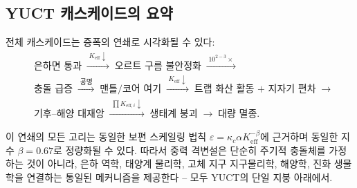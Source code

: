 \documentclass[12pt,a4paper]{article}
\begin{document}
	\subsection{YUCT 캐스케이드의 요약}
	전체 캐스케이드는 증폭의 연쇄로 시각화될 수 있다:
	{\small
		\[
		\begin{aligned}
			&\text{은하면 통과}
			\;\xrightarrow{\;K_{\mathrm{eff}}\downarrow\;}\;
			\text{오르트 구름 불안정화}
			\;\xrightarrow{\;10^{2-3}\times\;}\\
			&\text{충돌 급증}
			\;\xrightarrow{\;\text{공명}\;}\;
			\text{맨틀/코어 여기}
			\;\xrightarrow{\;K_{\mathrm{eff}}\downarrow\;}\;
			\text{트랩 화산 활동 + 지자기 편차}
			\;\xrightarrow{\;}\\
			&\text{기후–해양 대재앙}
			\;\xrightarrow{\;\prod K_{\mathrm{eff},i}\downarrow\;}\;
			\text{생태계 붕괴}
			\;\xrightarrow{\;}\;
			\text{대량 멸종}.
		\end{aligned}
		\]
	}
	
	이 연쇄의 모든 고리는 동일한 보편 스케일링 법칙 \(\varepsilon = \kappa_c \alpha K_{\mathrm{eff}}^{-\beta}\)에 근거하며 동일한 지수 \(\beta = 0.67\)로 정량화될 수 있다. 따라서 중력 격변설은 단순히 주기적 충돌체를 가정하는 것이 아니라, 은하 역학, 태양계 물리학, 고체 지구 지구물리학, 해양학, 진화 생물학을 연결하는 통일된 메커니즘을 제공한다 – 모두 YUCT의 단일 지붕 아래에서.
	
\end{document}
